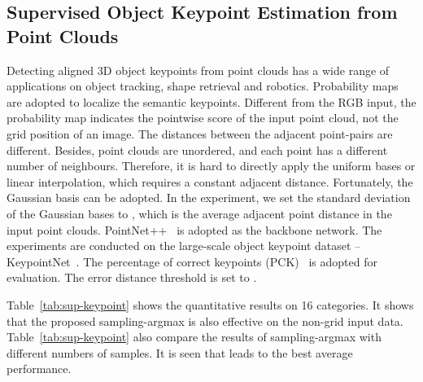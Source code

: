 \documentclass{article}
\begin{document}
\subsection{Supervised Object Keypoint Estimation from Point Clouds}
Detecting aligned 3D object keypoints from point clouds has a wide range of applications on object tracking, shape retrieval and robotics. Probability maps are adopted to localize the semantic keypoints. Different from the RGB input, the probability map indicates the pointwise score of the input point cloud, not the grid position of an image. The distances between the adjacent point-pairs are different. Besides, point clouds are unordered, and each point has a different number of neighbours. Therefore, it is hard to directly apply the uniform bases or linear interpolation, which requires a constant adjacent distance. Fortunately, the Gaussian basis can be adopted. In the experiment, we set the standard deviation  of the Gaussian bases to , which is the average adjacent point distance in the input point clouds. PointNet++~\cite{qi2017pointnetplusplus} is adopted as the backbone network. The experiments are conducted on the large-scale object keypoint dataset -- KeypointNet~\cite{you2020keypointnet}.
The percentage of correct keypoints (PCK)~\cite{yi2017syncspeccnn} is adopted for evaluation. The error distance threshold is set to .

Table~\ref{tab:sup-keypoint} shows the quantitative results on 16 categories. It shows that the proposed sampling-argmax is also effective on the non-grid input data. Table~\ref{tab:sup-keypoint} also compare the results of sampling-argmax with different numbers of samples. It is seen that  leads to the best average performance.
\end{document}
